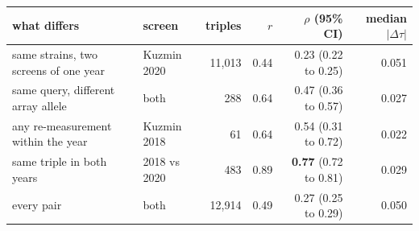 
\begin{tabular}{llrrrr}
\toprule
what differs & screen & triples & $r$ & $\rho$ (95\% CI) & median $|\Delta\tau|$ \\
\midrule
same strains, two screens of one year & Kuzmin 2020 & 11,013 & 0.44 & 0.23 (0.22 to 0.25) & 0.051 \\
same query, different array allele & both & 288 & 0.64 & 0.47 (0.36 to 0.57) & 0.027 \\
any re-measurement within the year & Kuzmin 2018 & 61 & 0.64 & 0.54 (0.31 to 0.72) & 0.022 \\
same triple in both years & 2018 vs 2020 & 483 & 0.89 & \textbf{0.77} (0.72 to 0.81) & 0.029 \\
every pair & both & 12,914 & 0.49 & 0.27 (0.25 to 0.29) & 0.050 \\
\bottomrule
\end{tabular}
